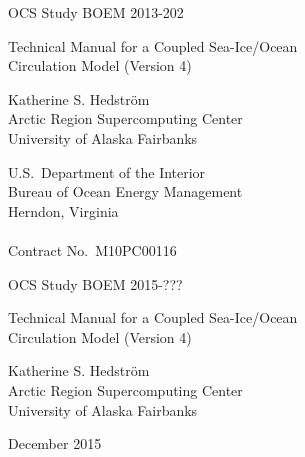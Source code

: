 %
%



\pagestyle{empty}
\centerline{\hfill OCS Study BOEM 2013-202}

\vspace {2 cm}
\begin{center}
  {\LARGE Technical Manual for a Coupled Sea-Ice/Ocean \\ Circulation
   Model (Version 4)  }
\end{center}
\vspace {2 cm}
\begin{center}
  Katherine S. Hedstr\"{o}m \\ Arctic Region Supercomputing Center
  \\ University of Alaska Fairbanks
\end{center}
\vspace {2 cm}
\begin{center}
  U.S.\ Department of the Interior \\ Bureau of Ocean Energy
  Management \\
  Herndon, Virginia \\ \mbox{} \\ Contract No.\ M10PC00116
\end{center}
\newpage
\centerline{\hfill OCS Study BOEM 2015-???}
\vspace {2 cm}
\begin{center}
  {\LARGE Technical Manual for a Coupled Sea-Ice/Ocean \\ Circulation
   Model (Version 4)  }
\end{center}
\vspace {2 cm}
\begin{center}
  Katherine S. Hedstr\"{o}m \\ Arctic Region Supercomputing Center
  \\ University of Alaska Fairbanks
\end{center}
\vspace {2 cm}
\centerline{December 2015}
\vfill


